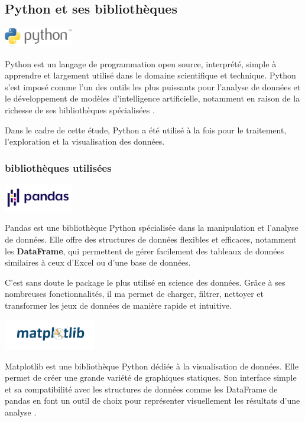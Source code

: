 \subsection{Python et ses bibliothèques }

\includegraphics[width=3cm]{images/python.png}

Python est un langage de programmation open source, interprété, 
simple à apprendre et largement utilisé dans le domaine scientifique et technique.
Python s’est imposé comme l’un des outils les plus puissants pour l’analyse de données et le développement de modèles d’intelligence artificielle, 
notamment en raison de la richesse de ses bibliothèques spécialisées \cite{python}.

Dans le cadre de cette étude, Python a été utilisé à la fois pour le traitement, l’exploration et la visualisation des données.

\subsubsection{bibliothèques utilisées}

\includegraphics[width=3cm]{images/Pandas_logo.png}

Pandas est une bibliothèque Python spécialisée dans la manipulation et l’analyse de données. 
Elle offre des structures de données flexibles et efficaces, notamment les \textbf{DataFrame}, 
qui permettent de gérer facilement des tableaux de données similaires à ceux d'Excel ou d'une base de données\cite{pandas}.

C’est sans doute le package le plus utilisé en science des données. Grâce à ses nombreuses fonctionnalités,
il ma permet de charger, filtrer, nettoyer et transformer les jeux de données de manière rapide et intuitive.

\includegraphics[width=4cm]{images/Matplotlib.png}

Matplotlib est une bibliothèque Python dédiée à la visualisation de données. 
Elle permet de créer une grande variété de graphiques statiques. 
Son interface simple et sa compatibilité avec les structures de données 
comme les DataFrame de pandas en font un outil de choix pour représenter visuellement les résultats d’une analyse \cite{matplotlib}.

